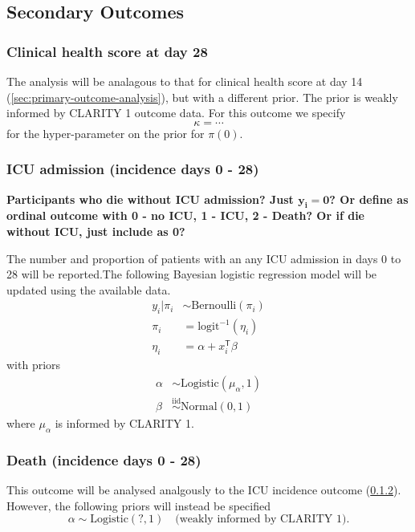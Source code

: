 \documentclass[11pt,parskip=half-]{scrartcl}
\begin{document}
\subsection{Secondary Outcomes}

\subsubsection{Clinical health score at day 28}
The analysis will be analagous to that for clinical health score at day 14 (\ref{sec:primary-outcome-analysis}), but with a different prior. The prior is weakly informed by CLARITY 1 outcome data. For this outcome we specify
$$
    \kappa = \cdots
$$
for the hyper-parameter on the prior for $\pi(0)$.

\subsubsection{ICU admission (incidence days 0 - 28)}\label{sec:icu-analysis}

\textbf{Participants who die without ICU admission? Just $\mathbf{y_i=0}$? Or define as ordinal outcome with 0 - no ICU, 1 - ICU, 2 - Death? Or if die without ICU, just include as 0?}

The number and proportion of patients with an any ICU admission in days 0 to 28 will be reported.The following Bayesian logistic regression model will be updated using the available data.
$$
    \begin{aligned}
        y_i|\pi_i & \sim \text{Bernoulli}(\pi_i)   \\
        \pi_i     & = \text{logit}^{-1}(\eta_i)    \\
        \eta_i    & = \alpha + x_i^\mathsf{T}\beta
    \end{aligned}
$$
with priors
$$
    \begin{aligned}
        \alpha & \sim \text{Logistic}(\mu_\alpha, 1)            \\
        \beta  & \overset{\text{iid}}{\sim} \text{Normal}(0, 1)
    \end{aligned}
$$
where $\mu_\alpha$ is informed by CLARITY 1.

\subsubsection{Death (incidence days 0 - 28)}
This outcome will be analysed analgously to the ICU incidence outcome (\ref{sec:icu-analysis}). However, the following priors will instead be specified
$$
    \alpha \sim \text{Logistic}(?, 1) \quad \text{(weakly informed by CLARITY 1)}.
$$
\end{document}
